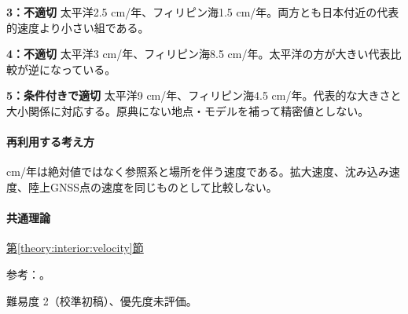 \noindent\textbf{3：不適切} 太平洋2.5 cm/年、フィリピン海1.5 cm/年。両方とも日本付近の代表的速度より小さい組である。\par

\noindent\textbf{4：不適切} 太平洋3 cm/年、フィリピン海8.5 cm/年。太平洋の方が大きい代表比較が逆になっている。\par

\noindent\textbf{5：条件付きで適切} 太平洋9 cm/年、フィリピン海4.5 cm/年。代表的な大きさと大小関係に対応する。原典にない地点・モデルを補って精密値としない。\par

\paragraph{再利用する考え方} cm/年は絶対値ではなく参照系と場所を伴う速度である。拡大速度、沈み込み速度、陸上GNSS点の速度を同じものとして比較しない。

\paragraph{共通理論} \hyperref[theory:interior:velocity]{第\ref*{theory:interior:velocity}節}

\par 参考：\cite{kagoshima_plate2019}。

\par 難易度 2（校準初稿）、優先度未評価。
